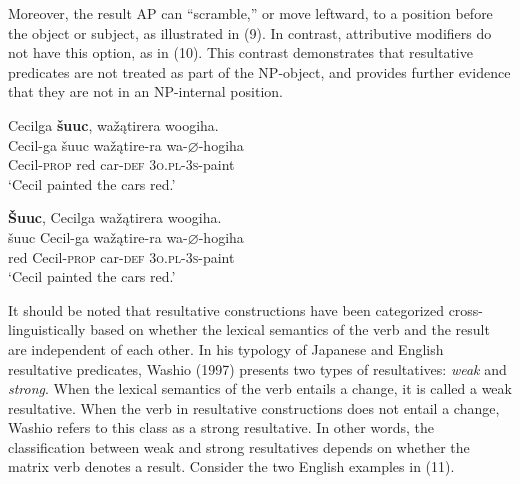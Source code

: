 \documentclass[output=paper]{LSP/langsci}
\begin{document}
Moreover, the result AP can ``scramble,'' or move leftward, to a position before the object or subject, as illustrated in (9). In contrast, attributive modifiers do not have this option, as in (10). This contrast demonstrates that resultative predicates are not treated as part of the NP-object, and provides further evidence that they are not in an NP-internal position.

\begin{exe}
\ex
\begin{xlist}

\ex \glll Cecilga \textbf{šuuc}, wažątirera woogiha. \\
 Cecil-ga šuuc  wažątire-ra wa-{$\varnothing$}-hogiha\\
 Cecil-\textsc{prop} red car-\textsc{def} \textsc{3o.pl}-\textsc{3s}-paint \\
\glt `Cecil painted the cars red.'

\ex \glll \textbf{\v{S}uuc}, Cecilga wažątirera woogiha. \\
  šuuc Cecil-ga wažątire-ra wa-{$\varnothing$}-hogiha\\
red Cecil-\textsc{prop} car-\textsc{def} \textsc{3o.pl}-\textsc{3s}-paint \\
\glt `Cecil painted the cars red.'

\end{xlist}




\end{exe}

It should be noted that resultative constructions have been categorized cross-linguistically based on whether the lexical semantics of the verb and the result are independent of each other. In his typology of Japanese and English resultative predicates, Washio (1997) presents two types of resultatives: \textit{weak} and \textit{strong}. When the lexical semantics of the verb entails a change, it is called a weak resultative. When the verb in resultative constructions does not entail a change, Washio refers to this class as a strong resultative. In other words, the classification between weak and strong resultatives depends on whether the matrix verb denotes a result. Consider the two English examples in (11).
\end{document}
